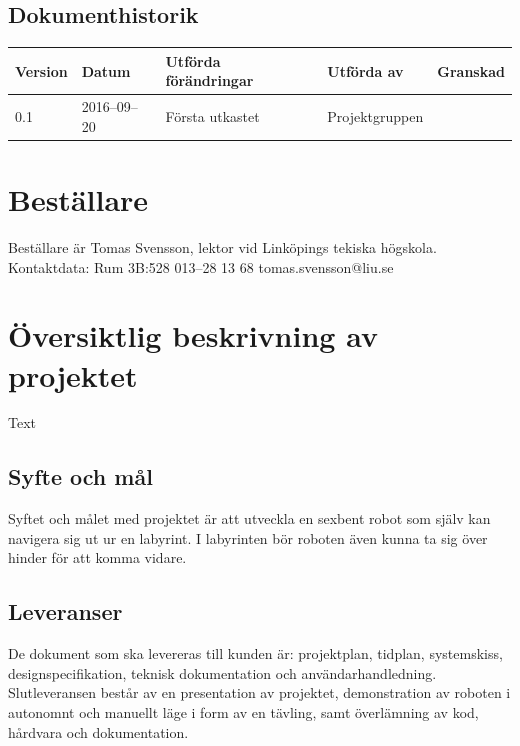\documentclass[a4paper,titlepage,12pt]{article}
\begin{document}
\begin{center}
		\newpage
		\tableofcontents
		\newpage



		\section*{Dokumenthistorik}
		\renewcommand*{\arraystretch}{1.4}
		\begin{longtable}[c]{ l l l l l }
			\textbf{Version} & \textbf{Datum} & \textbf{Utförda förändringar} 
			& \textbf{Utförda av} & \textbf{Granskad} \\ \midrule

			0.1 & 2016--09--20 & Första utkastet & Projektgruppen & \\
		\end{longtable}
	\end{center}

	\newpage

	\section{Beställare}
	Beställare är Tomas Svensson, lektor vid Linköpings tekiska högskola. \\
  Kontaktdata: Rum 3B:528 013–28 13 68 tomas.svensson@liu.se


	\newpage
	\section{Översiktlig beskrivning av projektet}
	Text

	\subsection{Syfte och mål}
	Syftet och målet med projektet är att utveckla en sexbent robot som själv
    kan navigera sig ut ur en labyrint. I labyrinten bör roboten även kunna ta
    sig över hinder för att komma vidare.

	
	
	\subsection{Leveranser}
	De dokument som ska levereras till kunden är: projektplan, tidplan,
    systemskiss, designspecifikation, teknisk dokumentation och
    användarhandledning. Slutleveransen består av en presentation av projektet,
    demonstration av roboten i autonomnt och manuellt läge i form av en tävling,
    samt överlämning av kod, hårdvara och dokumentation.
	
\end{document}

